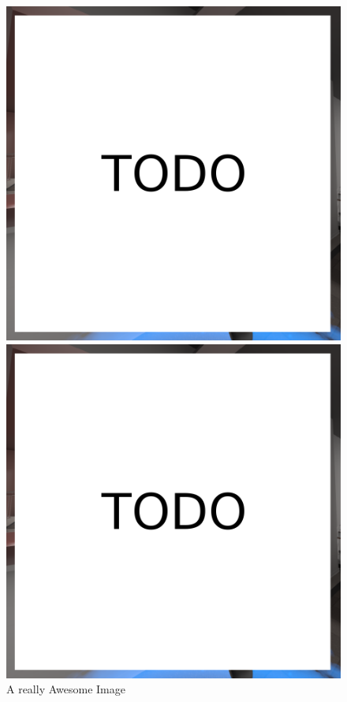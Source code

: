 \begin{figure}[!htb]
  \includegraphics[width=\linewidth]{images/todo.png}
  \caption{A really Awesome Image}\label{fig:awesome_image1}
\endminipage\hfill
{}
  \includegraphics[width=\linewidth]{images/todo.png}

\end{figure}
